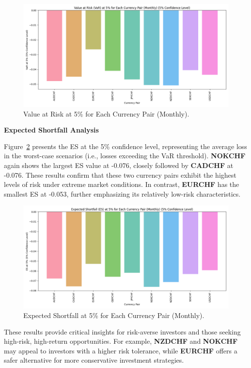 \documentclass{article}
\begin{document}
\begin{figure}[H]
    \centering
    \includegraphics[width=0.75\linewidth]{../../reports/figures/VaR_5_percent_plot.png}
    \caption{Value at Risk at 5\% for Each Currency Pair (Monthly).}
    \label{fig:VaR_plot}
\end{figure}

\textbf{Expected Shortfall Analysis}

Figure~\ref{fig:ES_plot} presents the ES at the 5\% confidence level, representing the average loss in the worst-case scenarios (i.e., losses exceeding the VaR threshold). \textbf{NOKCHF} again shows the largest ES value at -0.076, closely followed by \textbf{CADCHF} at -0.076. These results confirm that these two currency pairs exhibit the highest levels of risk under extreme market conditions. In contrast, \textbf{EURCHF} has the smallest ES at -0.053, further emphasizing its relatively low-risk characteristics.

\begin{figure}[H]
    \centering
    \includegraphics[width=0.75\linewidth]{../../reports/figures/ES_5_percent_plot.png}
    \caption{Expected Shortfall at 5\% for Each Currency Pair (Monthly).}
    \label{fig:ES_plot}
\end{figure}

These results provide critical insights for risk-averse investors and those seeking high-risk, high-return opportunities. For example, \textbf{NZDCHF} and \textbf{NOKCHF} may appeal to investors with a higher risk tolerance, while \textbf{EURCHF} offers a safer alternative for more conservative investment strategies.
\end{document}
